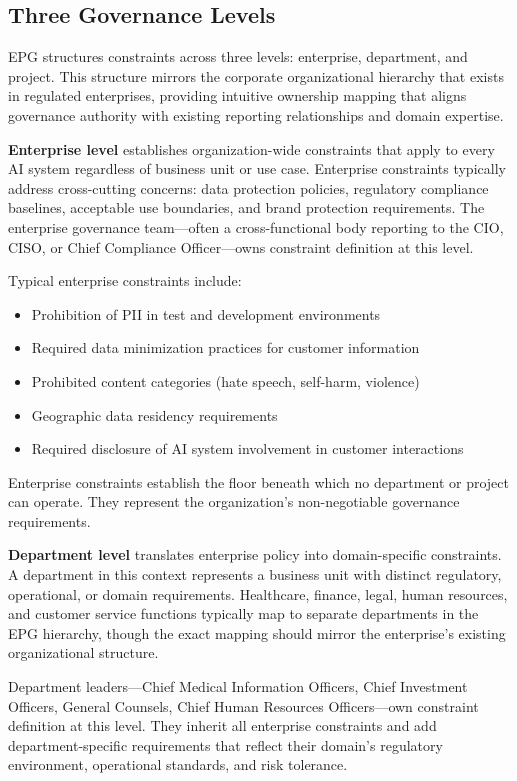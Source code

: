 \subsection{Three Governance Levels}


EPG structures constraints across three levels: enterprise, department, and project. This structure mirrors the corporate organizational hierarchy that exists in regulated enterprises, providing intuitive ownership mapping that aligns governance authority with existing reporting relationships and domain expertise.

\textbf{Enterprise level} establishes organization-wide constraints that apply to every AI system regardless of business unit or use case. Enterprise constraints typically address cross-cutting concerns: data protection policies, regulatory compliance baselines, acceptable use boundaries, and brand protection requirements. The enterprise governance team---often a cross-functional body reporting to the CIO, CISO, or Chief Compliance Officer---owns constraint definition at this level.

Typical enterprise constraints include:

\begin{itemize}
  \item Prohibition of PII in test and development environments
  \item Required data minimization practices for customer information
  \item Prohibited content categories (hate speech, self-harm, violence)
  \item Geographic data residency requirements
  \item Required disclosure of AI system involvement in customer interactions
\end{itemize}


Enterprise constraints establish the floor beneath which no department or project can operate. They represent the organization's non-negotiable governance requirements.

\textbf{Department level} translates enterprise policy into domain-specific constraints. A department in this context represents a business unit with distinct regulatory, operational, or domain requirements. Healthcare, finance, legal, human resources, and customer service functions typically map to separate departments in the EPG hierarchy, though the exact mapping should mirror the enterprise's existing organizational structure.

Department leaders---Chief Medical Information Officers, Chief Investment Officers, General Counsels, Chief Human Resources Officers---own constraint definition at this level. They inherit all enterprise constraints and add department-specific requirements that reflect their domain's regulatory environment, operational standards, and risk tolerance.

